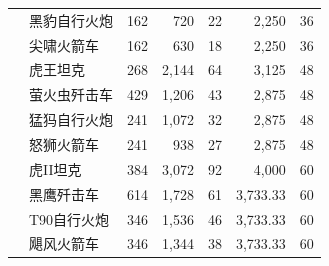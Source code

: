 \begin{small}
\begin{longtable}{@{}P{35mm}P{24mm}rrrrr@{}}
 & 黑豹自行火炮 & 162 & 720 & 22 & 2,250 & 36 \\
 & 尖啸火箭车 & 162 & 630 & 18 & 2,250 & 36 \\
 & 虎王坦克 & 268 & 2,144 & 64 & 3,125 & 48 \\
 & 萤火虫歼击车 & 429 & 1,206 & 43 & 2,875 & 48 \\
 & 猛犸自行火炮 & 241 & 1,072 & 32 & 2,875 & 48 \\
 & 怒狮火箭车 & 241 & 938 & 27 & 2,875 & 48 \\
 & 虎II坦克 & 384 & 3,072 & 92 & 4,000 & 60 \\
 & 黑鹰歼击车 & 614 & 1,728 & 61 & 3,733.33 & 60 \\
 & T90自行火炮 & 346 & 1,536 & 46 & 3,733.33 & 60 \\
 & 飓风火箭车 & 346 & 1,344 & 38 & 3,733.33 & 60 \\
\bottomrule
\end{longtable}
\end{small}
\clearpage
